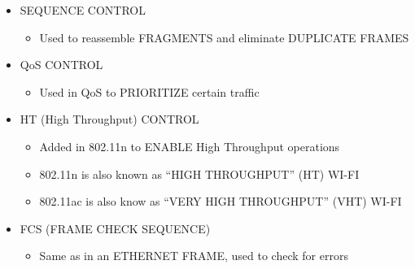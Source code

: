 \begin{itemize}
  \begin{itemize}
  \tightlist
  \item
    Up to FOUR ADDRESSES can be present in an 802.11 FRAME.
  \item
    Which ADDRESSES are present, and their ORDER, depends on the MESSAGE
    TYPE

    \begin{itemize}
    \tightlist
    \item
      DESTINATION ADDRESS (DA) : Final RECIPIENT of the FRAME
    \item
      SOURCE ADDRESS (SA) : Original SENDER of the FRAME
    \item
      RECEIVER ADDRESS (RA) : Immediate RECIPIENT of the FRAME
    \item
      TRANSMITTER ADDRESS (TA) : Immediate SENDER of the FRAME
    \end{itemize}
  \end{itemize}
\item
  SEQUENCE CONTROL

  \begin{itemize}
  \tightlist
  \item
    Used to reassemble FRAGMENTS and eliminate DUPLICATE FRAMES
  \end{itemize}
\item
  QoS CONTROL

  \begin{itemize}
  \tightlist
  \item
    Used in QoS to PRIORITIZE certain traffic
  \end{itemize}
\item
  HT (High Throughput) CONTROL

  \begin{itemize}
  \tightlist
  \item
    Added in 802.11n to ENABLE High Throughput operations
  \item
    802.11n is also known as ``HIGH THROUGHPUT'' (HT) WI-FI
  \item
    802.11ac is also know as ``VERY HIGH THROUGHPUT'' (VHT) WI-FI
  \end{itemize}
\item
  FCS (FRAME CHECK SEQUENCE)

  \begin{itemize}
  \tightlist
  \item
    Same as in an ETHERNET FRAME, used to check for errors
  \end{itemize}
\end{itemize}

